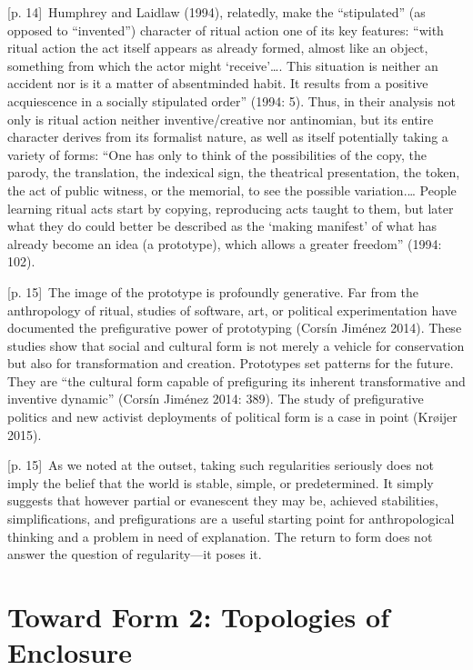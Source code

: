 \documentclass[10pt,a4paper]{article}
\begin{document}
{\scriptsize\color{gray} [p. 14]}\ Humphrey and Laidlaw (1994), relatedly, make the “stipulated” (as opposed to “invented”) character of ritual action one of its key features: “with ritual action the act itself appears as already formed, almost like an object, something from which the actor might ‘receive’…. This situation is neither an accident nor is it a matter of absentminded habit. It results from a positive acquiescence in a socially stipulated order” (1994: 5). Thus, in their analysis not only is ritual action neither inventive/creative nor antinomian, but its entire character derives from its formalist nature, as well as itself potentially taking a variety of forms: “One has only to think of the possibilities of the copy, the parody, the translation, the indexical sign, the theatrical presentation, the token, the act of public witness, or the memorial, to see the possible variation.… People learning ritual acts start by copying, reproducing acts taught to them, but later what they do could better be described as the ‘making manifest’ of what has already become an idea (a prototype), which allows a greater freedom” (1994: 102).\par
{\scriptsize\color{gray} [p. 15]}\ The image of the prototype is profoundly generative. Far from the anthropology of ritual, studies of software, art, or political experimentation have documented the prefigurative power of prototyping (Corsín Jiménez 2014). These studies show that social and cultural form is not merely a vehicle for conservation but also for transformation and creation. Prototypes set patterns for the future. They are “the cultural form capable of prefiguring its inherent transformative and inventive dynamic” (Corsín Jiménez 2014: 389). The study of prefigurative politics and new activist deployments of political form is a case in point (Krøijer 2015).\par
{\scriptsize\color{gray} [p. 15]}\ As we noted at the outset, taking such regularities seriously does not imply the belief that the world is stable, simple, or predetermined. It simply suggests that however partial or evanescent they may be, achieved stabilities, simplifications, and prefigurations are a useful starting point for anthropological thinking and a problem in need of explanation. The return to form does not answer the question of regularity—it poses it.\par
{}\section*{Toward Form 2: Topologies of Enclosure}
\end{document}
